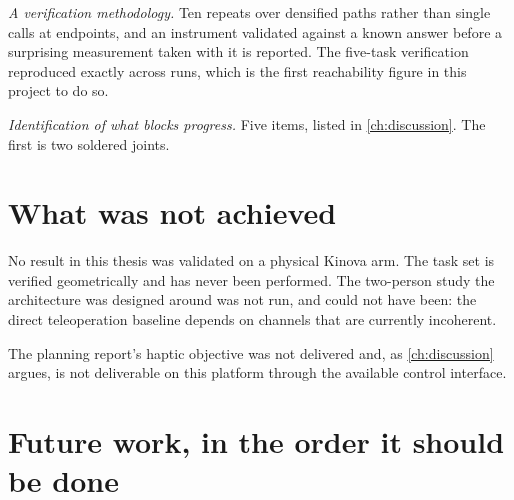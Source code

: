 \emph{A verification methodology.} Ten repeats over densified paths rather
than single calls at endpoints, and an instrument validated against a known
answer before a surprising measurement taken with it is reported. The
five-task verification reproduced exactly across runs, which is the first
reachability figure in this project to do so.

\emph{Identification of what blocks progress.} Five items, listed in
\cref{ch:discussion}. The first is two soldered joints.

\section{What was not achieved}

No result in this thesis was validated on a physical Kinova arm. The task set
is verified geometrically and has never been performed. The two-person study
the architecture was designed around was not run, and could not have been:
the direct teleoperation baseline depends on channels that are currently
incoherent.

The planning report's haptic objective was not delivered and, as
\cref{ch:discussion} argues, is not deliverable on this platform through the
available control interface.

\section{Future work, in the order it should be done}

